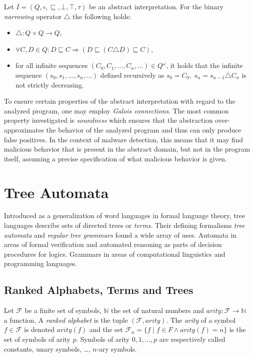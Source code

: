 \begin{defn}
Let $I = (Q, \circ, \sqsubseteq, \bot, \top, \tau)$ be an abstract interpretation. For the binary \emph{narrowing} operator $\triangle$ the following holds:
\begin{itemize}
    \item $\triangle: Q \times Q \rightarrow Q$,
    \item $\forall C,D \in Q: D \sqsubseteq C \Rightarrow (D \sqsubseteq (C \triangle D) \sqsubseteq C)$,
    \item for all infinite sequences $(C_0, C_1, \dots, C_n, \dots) \in Q^\omega$, it holds that the infinite sequence $(s_0, s_1, \dots, s_n, \dots)$ defined recursively as $s_0 = C_0, \; s_n = s_{n-1} \triangle C_n$ is not strictly decreasing.
\end{itemize}
\end{defn}

To ensure certain properties of the abstract interpretation with regard to the analyzed program, one may employ \emph{Galois connections}. The most common property investigated is \emph{soundness} which ensures that the abstraction over-approximates the behavior of the analyzed program and thus can only produce false positives. In the context of malware detection, this means that it may find malicious behavior that is present in the abstract domain, but not in the program itself, assuming a precise specification of what malicious behavior is given.

\section{Tree Automata}
\label{s_tree_automata}
Introduced as a generalization of word languages in formal language theory, tree languages describe sets of directed trees or \emph{terms}. Their defining formalisms \emph{tree automata} and \emph{regular tree grammars} found a wide array of uses. Automata in areas of formal verification and automated reasoning as parts of decision procedures for logics. Grammars in areas of computational linguistics and programming languages.

\subsection{Ranked Alphabets, Terms and Trees}
\begin{defn}
Let $\mathcal{F}$ be a finite set of symbols, $\mathbb{N}$ the set of natural numbers and $arity: \mathcal{F} \rightarrow \mathbb{N}$ a function. A \emph{ranked alphabet} is the tuple $(\mathcal{F}, arity)$. The \emph{arity} of a symbol $f \in \mathcal{F}$ is denoted $arity(f)$ and the set $\mathcal{F}_n = \{f \; | \; f \in F \wedge arity(f) = n\}$ is the set of symbols of arity $p$. Symbols of arity $0, 1, \dots, p$ are respectively called constants, unary symbols, \dots, $n$-ary symbols.
\end{defn}

